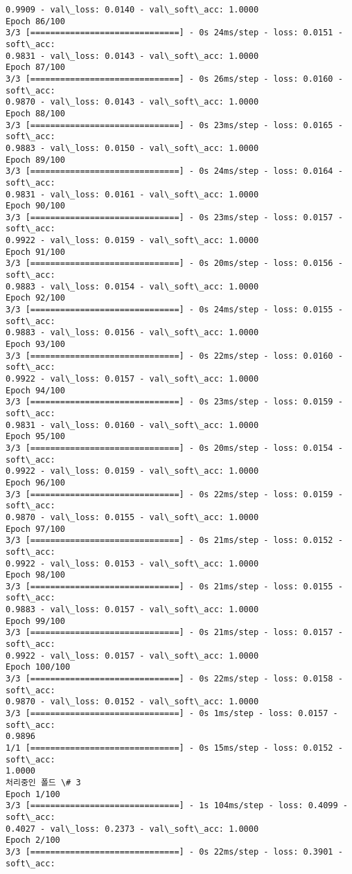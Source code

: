\documentclass[11pt]{article}
\begin{document}
\begin{Verbatim}[commandchars=\\\{\}]
0.9909 - val\_loss: 0.0140 - val\_soft\_acc: 1.0000
Epoch 86/100
3/3 [==============================] - 0s 24ms/step - loss: 0.0151 - soft\_acc:
0.9831 - val\_loss: 0.0143 - val\_soft\_acc: 1.0000
Epoch 87/100
3/3 [==============================] - 0s 26ms/step - loss: 0.0160 - soft\_acc:
0.9870 - val\_loss: 0.0143 - val\_soft\_acc: 1.0000
Epoch 88/100
3/3 [==============================] - 0s 23ms/step - loss: 0.0165 - soft\_acc:
0.9883 - val\_loss: 0.0150 - val\_soft\_acc: 1.0000
Epoch 89/100
3/3 [==============================] - 0s 24ms/step - loss: 0.0164 - soft\_acc:
0.9831 - val\_loss: 0.0161 - val\_soft\_acc: 1.0000
Epoch 90/100
3/3 [==============================] - 0s 23ms/step - loss: 0.0157 - soft\_acc:
0.9922 - val\_loss: 0.0159 - val\_soft\_acc: 1.0000
Epoch 91/100
3/3 [==============================] - 0s 20ms/step - loss: 0.0156 - soft\_acc:
0.9883 - val\_loss: 0.0154 - val\_soft\_acc: 1.0000
Epoch 92/100
3/3 [==============================] - 0s 24ms/step - loss: 0.0155 - soft\_acc:
0.9883 - val\_loss: 0.0156 - val\_soft\_acc: 1.0000
Epoch 93/100
3/3 [==============================] - 0s 22ms/step - loss: 0.0160 - soft\_acc:
0.9922 - val\_loss: 0.0157 - val\_soft\_acc: 1.0000
Epoch 94/100
3/3 [==============================] - 0s 23ms/step - loss: 0.0159 - soft\_acc:
0.9831 - val\_loss: 0.0160 - val\_soft\_acc: 1.0000
Epoch 95/100
3/3 [==============================] - 0s 20ms/step - loss: 0.0154 - soft\_acc:
0.9922 - val\_loss: 0.0159 - val\_soft\_acc: 1.0000
Epoch 96/100
3/3 [==============================] - 0s 22ms/step - loss: 0.0159 - soft\_acc:
0.9870 - val\_loss: 0.0155 - val\_soft\_acc: 1.0000
Epoch 97/100
3/3 [==============================] - 0s 21ms/step - loss: 0.0152 - soft\_acc:
0.9922 - val\_loss: 0.0153 - val\_soft\_acc: 1.0000
Epoch 98/100
3/3 [==============================] - 0s 21ms/step - loss: 0.0155 - soft\_acc:
0.9883 - val\_loss: 0.0157 - val\_soft\_acc: 1.0000
Epoch 99/100
3/3 [==============================] - 0s 21ms/step - loss: 0.0157 - soft\_acc:
0.9922 - val\_loss: 0.0157 - val\_soft\_acc: 1.0000
Epoch 100/100
3/3 [==============================] - 0s 22ms/step - loss: 0.0158 - soft\_acc:
0.9870 - val\_loss: 0.0152 - val\_soft\_acc: 1.0000
3/3 [==============================] - 0s 1ms/step - loss: 0.0157 - soft\_acc:
0.9896
1/1 [==============================] - 0s 15ms/step - loss: 0.0152 - soft\_acc:
1.0000
처리중인 폴드 \# 3
Epoch 1/100
3/3 [==============================] - 1s 104ms/step - loss: 0.4099 - soft\_acc:
0.4027 - val\_loss: 0.2373 - val\_soft\_acc: 1.0000
Epoch 2/100
3/3 [==============================] - 0s 22ms/step - loss: 0.3901 - soft\_acc:

\end{Verbatim}
\end{document}
